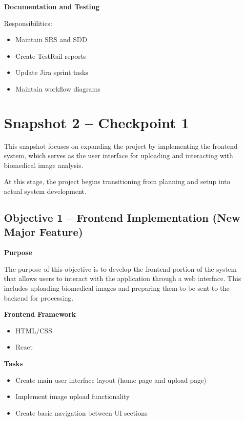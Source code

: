\documentclass[12pt]{article}
\begin{document}
\textbf{Documentation and Testing}

Responsibilities:

\begin{itemize}
    \item Maintain SRS and SDD
    \item Create TestRail reports
    \item Update Jira sprint tasks
    \item Maintain workflow diagrams
\end{itemize}

\newpage

\section{Snapshot 2 -- Checkpoint 1}

This snapshot focuses on expanding the project by implementing the frontend system,
which serves as the user interface for uploading and interacting with biomedical image
analysis.

At this stage, the project begins transitioning from planning and setup into actual system
development.

\subsection{Objective 1 -- Frontend Implementation (New Major Feature)}

\textbf{Purpose}

The purpose of this objective is to develop the frontend portion of the system that allows
users to interact with the application through a web interface. This includes uploading
biomedical images and preparing them to be sent to the backend for processing.

\textbf{Frontend Framework}

\begin{itemize}
    \item HTML/CSS
    \item React
\end{itemize}

\textbf{Tasks}

\begin{itemize}
    \item Create main user interface layout (home page and upload page)
    \item Implement image upload functionality
    \item Create basic navigation between UI sections
\end{itemize}
\end{document}
